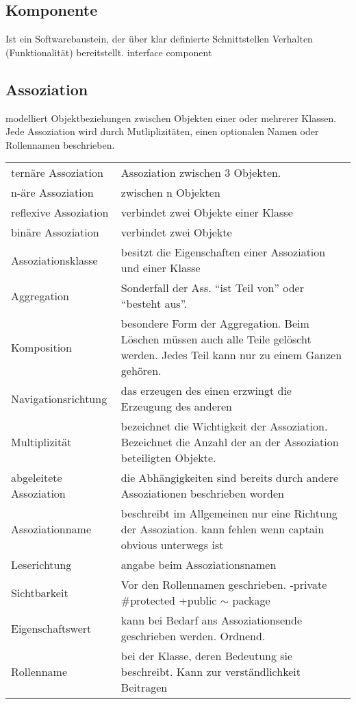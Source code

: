 \subsection{Komponente}
Ist ein Softwarebaustein, der über klar definierte Schnittstellen Verhalten
(Funktionalität) bereitstellt.
interface
component

\subsection{Assoziation}
	modelliert Objektbeziehungen zwischen Objekten einer oder mehrerer Klassen. Jede
	Assoziation wird durch Mutliplizitäten, einen optionalen Namen oder Rollennamen
	beschrieben.\\
	\begin{tabular}{p{3.5cm}p{14.5cm}}
		ternäre Assoziation & Assoziation zwischen 3 Objekten.\\
		n-äre Assoziation & zwischen n Objekten\\
		reflexive Assoziation & verbindet zwei Objekte einer Klasse\\
		binäre Assoziation & verbindet zwei Objekte \\
		Assoziationsklasse & besitzt die Eigenschaften einer Assoziation und einer
		Klasse \\
		Aggregation & Sonderfall der Ass. "`ist Teil von"' oder "`besteht aus"'.\\
		Komposition & besondere Form der Aggregation. Beim Löschen müssen auch alle
		Teile gelöscht werden. Jedes Teil kann nur zu einem Ganzen gehören.\\
		Navigationsrichtung & das erzeugen des einen erzwingt die Erzeugung des
		anderen\\
		Multiplizität & bezeichnet die Wichtigkeit der Assoziation. Bezeichnet die
		Anzahl der an der Assoziation beteiligten Objekte.\\
		abgeleitete Assoziation &
		die Abhängigkeiten sind bereits durch andere Assoziationen beschrieben worden\\
		Assoziationname & beschreibt im Allgemeinen nur eine Richtung der
		Assoziation. kann fehlen wenn captain obvious unterwegs ist\\ 
		Leserichtung & angabe beim Assoziationsnamen\\ 
		Sichtbarkeit & Vor den Rollennamen geschrieben. -private \#protected +public
		$\sim$ package\\ 
		Eigenschaftswert & kann bei Bedarf ans Assoziationsende geschrieben werden.
		Ordnend.\\
		Rollenname & bei der Klasse, deren Bedeutung sie beschreibt. Kann zur
		verständlichkeit Beitragen\\
	\end{tabular}

